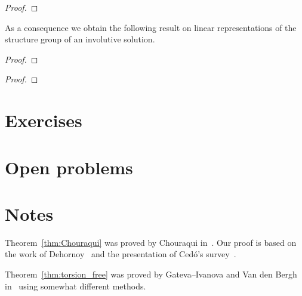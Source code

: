 \begin{proof}

\end{proof}

As a consequence we obtain the following result on linear 
representations of the structure group of an involutive solution.

\begin{theorem}
\label{thm:ESS}
\end{theorem}

\begin{proof}

\end{proof}

\begin{theorem}
\label{thm:D}
\end{theorem}

\begin{proof}

\end{proof}

\section*{Exercises}

\section*{Open problems}

\section*{Notes}

Theorem~\ref{thm:Chouraqui} was proved by Chouraqui in~\cite{MR2764830}. Our proof is based on the work 
of Dehornoy~\cite{MR3374524} and the presentation of Cedó's survey~\cite{MR3824447}. 

Theorem~\ref{thm:torsion_free} was proved by Gateva--Ivanova and Van den Bergh in~\cite{MR1637256} using somewhat 
different methods. 